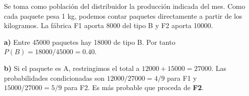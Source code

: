 Se toma como población del distribuidor la producción
indicada del mes. Como cada paquete pesa 1 kg, podemos
contar paquetes directamente a partir de los kilogramos.
La fábrica F1 aporta 8000 del tipo B y F2 aporta 10000.

\textbf{a)} Entre 45000 paquetes hay 18000 de tipo B.
Por tanto $P(B)=18000/45000=\boxed{0.40}$.

\textbf{b)} Si el paquete es A, restringimos el total a
$12000+15000=27000$. Las probabilidades condicionadas son
$12000/27000=4/9$ para F1 y $15000/27000=5/9$ para F2.
Es más probable que proceda de \textbf{F2}.

